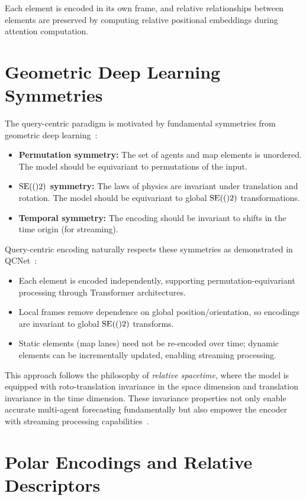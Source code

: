 Each element is encoded in its own frame, and relative relationships between elements are preserved by computing relative positional embeddings during attention computation.

\section{Geometric Deep Learning Symmetries}
The query-centric paradigm is motivated by fundamental symmetries from geometric deep learning~\cite{bronstein2021geometric}:
\begin{itemize}
    \item \textbf{Permutation symmetry:} The set of agents and map elements is unordered. The model should be equivariant to permutations of the input.
    \item \textbf{$\mathrm{SE}(()2)$ symmetry:} The laws of physics are invariant under translation and rotation. The model should be equivariant to global $\mathrm{SE}(()2)$ transformations.
    \item \textbf{Temporal symmetry:} The encoding should be invariant to shifts in the time origin (for streaming).
\end{itemize}

Query-centric encoding naturally respects these symmetries as demonstrated in QCNet~\cite{Zhou2023QueryCentric}:
\begin{itemize}
    \item Each element is encoded independently, supporting permutation-equivariant processing through Transformer architectures.
    \item Local frames remove dependence on global position/orientation, so encodings are invariant to global $\mathrm{SE}(()2)$ transforms.
    \item Static elements (map lanes) need not be re-encoded over time; dynamic elements can be incrementally updated, enabling streaming processing.
\end{itemize}

This approach follows the philosophy of \emph{relative spacetime}, where the model is equipped with roto-translation invariance in the space dimension and translation invariance in the time dimension. These invariance properties not only enable accurate multi-agent forecasting fundamentally but also empower the encoder with streaming processing capabilities~\cite{qcnextZhou2023}.

\section{Polar Encodings and Relative Descriptors}
